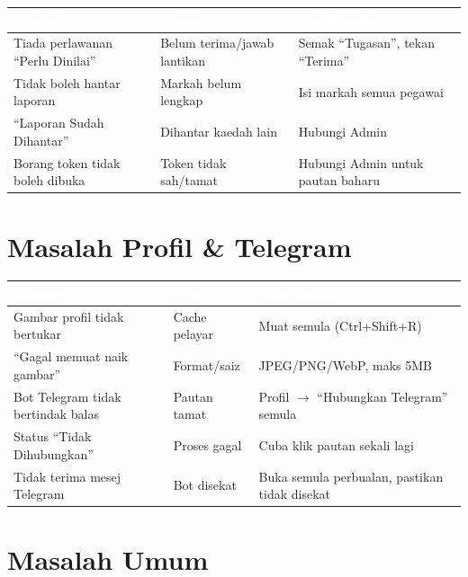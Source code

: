 \documentclass[12pt,a4paper]{report}
\begin{document}
\begin{longtable}{L{4cm} L{3.5cm} L{6.5cm}}
\toprule
{}
\textcolor{white}{\textbf{Masalah}} & \textcolor{white}{\textbf{Punca}} & \textcolor{white}{\textbf{Penyelesaian}} \\
\midrule
\endhead
{}
Tiada perlawanan ``Perlu Dinilai'' & Belum terima/jawab lantikan & Semak ``Tugasan'', tekan ``Terima'' \\
Tidak boleh hantar laporan & Markah belum lengkap & Isi markah semua pegawai \\
``Laporan Sudah Dihantar'' & Dihantar kaedah lain & Hubungi Admin \\
Borang token tidak boleh dibuka & Token tidak sah/tamat & Hubungi Admin untuk pautan baharu \\
\bottomrule
\end{longtable}

\section{Masalah Profil \& Telegram}

\begin{longtable}{L{4cm} L{3.5cm} L{6.5cm}}
\toprule
{}
\textcolor{white}{\textbf{Masalah}} & \textcolor{white}{\textbf{Punca}} & \textcolor{white}{\textbf{Penyelesaian}} \\
\midrule
\endhead
{}
Gambar profil tidak bertukar & Cache pelayar & Muat semula (Ctrl+Shift+R) \\
``Gagal memuat naik gambar'' & Format/saiz & JPEG/PNG/WebP, maks 5MB \\
Bot Telegram tidak bertindak balas & Pautan tamat & Profil $\rightarrow$ ``Hubungkan Telegram'' semula \\
Status ``Tidak Dihubungkan'' & Proses gagal & Cuba klik pautan sekali lagi \\
Tidak terima mesej Telegram & Bot disekat & Buka semula perbualan, pastikan tidak disekat \\
\bottomrule
\end{longtable}

\section{Masalah Umum}
\end{document}
